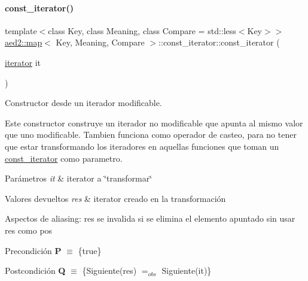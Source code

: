 \mbox{\label{classaed2_1_1map_1_1const__iterator_ab7924d90cbf6d19bec62514d10b62fb3_ab7924d90cbf6d19bec62514d10b62fb3}} 
\paragraph{\texorpdfstring{const\+\_\+iterator()}{const\_iterator()}\hspace{0.1cm}{\footnotesize\ttfamily [2/3]}}
{\footnotesize\ttfamily template$<$class Key, class Meaning, class Compare = std\+::less$<$\+Key$>$$>$ \\
\hyperlink{classaed2_1_1map}{aed2\+::map}$<$ Key, Meaning, Compare $>$\+::const\+\_\+iterator\+::const\+\_\+iterator (\begin{DoxyParamCaption}\item[{\hyperlink{classaed2_1_1map_1_1iterator}{iterator}}]{it }\end{DoxyParamCaption})\hspace{0.3cm}{\ttfamily [inline]}}



Constructor desde un iterador modificable. 

Este constructor construye un iterador no modificable que apunta al mismo valor que uno modificable. Tambien funciona como operador de casteo, para no tener que estar transformando los iteradores en aquellas funciones que toman un {\ttfamily \hyperlink{classaed2_1_1map_1_1const__iterator}{const\+\_\+iterator}} como parametro.


\begin{DoxyParams}{Parámetros}
{\em it} & iterator a \char`\"{}transformar\char`\"{} \\
\hline
\end{DoxyParams}

\begin{DoxyRetVals}{Valores devueltos}
{\em res} & iterator creado en la transformación\\
\hline
\end{DoxyRetVals}
\begin{DoxyParagraph}{Aspectos de aliasing\+:}
res se invalida si se elimina el elemento apuntado sin usar res como pos
\end{DoxyParagraph}
\begin{DoxyPrecond}{Precondición}
{\bfseries P} $\equiv$ \{true\} 
\end{DoxyPrecond}
\begin{DoxyPostcond}{Postcondición}
{\bfseries Q} $\equiv$ \{Siguiente(res) $=_{obs}$ Siguiente(it)\}
\end{DoxyPostcond}

